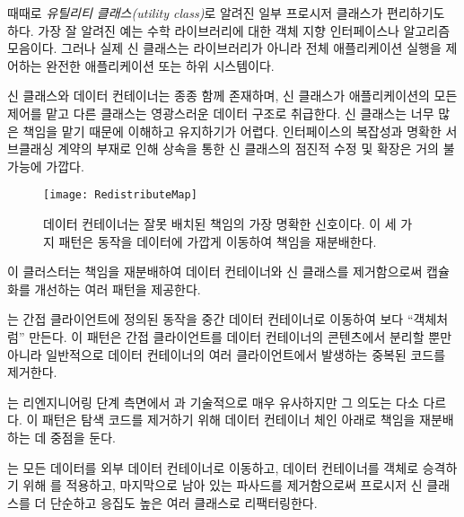 \documentclass[a4paper,10pt,twoside]{book}
\begin{document}
때때로 \emph{유틸리티 클래스(utility class)}로 알려진 일부 프로시저 클래스가 편리하기도 하다. 가장 잘 알려진 예는 수학 라이브러리에 대한 객체 지향 인터페이스나 알고리즘 모음이다. 그러나 실제 신 클래스는 라이브러리가 아니라 전체 애플리케이션 실행을 제어하는 완전한 애플리케이션 또는 하위 시스템이다.

신 클래스와 데이터 컨테이너는 종종 함께 존재하며, 신 클래스가 애플리케이션의 모든 제어를 맡고 다른 클래스는 영광스러운 데이터 구조로 취급한다. 신 클래스는 너무 많은 책임을 맡기 때문에 이해하고 유지하기가 어렵다. 인터페이스의 복잡성과 명확한 서브클래싱 계약의 부재로 인해 상속을 통한 신 클래스의 점진적 수정 및 확장은 거의 불가능에 가깝다.

\begin{figure}[h]
\begin{center}
\texttt{[image: RedistributeMap]}
\caption{데이터 컨테이너는 잘못 배치된 책임의 가장 명확한 신호이다. 이 세 가지 패턴은 동작을 데이터에 가깝게 이동하여 책임을 재분배한다.}
\end{center}
\end{figure}

이 클러스터는 책임을 재분배하여 데이터 컨테이너와 신 클래스를 제거함으로써 캡슐화를 개선하는 여러 패턴을 제공한다.

\begin{bulletlist}
\item {}는 간접 클라이언트에 정의된 동작을 중간 데이터 컨테이너로 이동하여 보다 ``객체처럼'' 만든다. 이 패턴은 간접 클라이언트를 데이터 컨테이너의 콘텐츠에서 분리할 뿐만 아니라 일반적으로 데이터 컨테이너의 여러 클라이언트에서 발생하는 중복된 코드를 제거한다.

\item {}는 리엔지니어링 단계 측면에서 과 기술적으로 매우 유사하지만 그 의도는 다소 다르다. 이 패턴은 탐색 코드를 제거하기 위해 데이터 컨테이너 체인 아래로 책임을 재분배하는 데 중점을 둔다.
	
\item {}는 모든 데이터를 외부 데이터 컨테이너로 이동하고, 데이터 컨테이너를 객체로 승격하기 위해 를 적용하고, 마지막으로 남아 있는 파사드를 제거함으로써 프로시저 신 클래스를 더 단순하고 응집도 높은 여러 클래스로 리팩터링한다.
\end{bulletlist}
\end{document}
